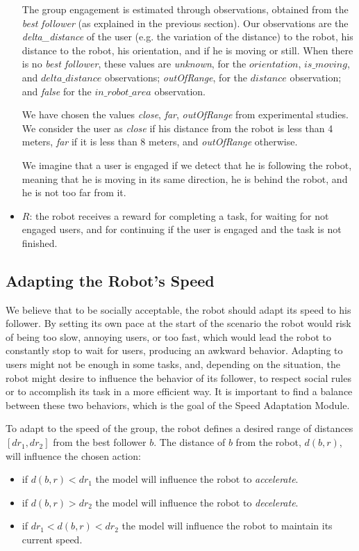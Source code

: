 \begin{itemize}
		The group engagement is estimated through observations, obtained from the \textit{best follower} (as explained in the previous section). Our observations are the \textit{delta\_distance} of the user (e.g. the variation of the distance) to the robot, his distance to the robot, his orientation, and if he is moving or still. When there is no \textit{best follower}, these values are \textit{unknown}, for the $orientation$, $is\_moving$, and $delta\_distance$ observations; \textit{outOfRange}, for the $distance$ observation; and \textit{false} for the $in\_robot\_area$ observation.

		We have chosen the values \textit{close}, \textit{far}, \textit{outOfRange} from experimental studies. We consider the user as \textit{close} if his distance from the robot is less than 4 meters, \textit{far} if it is less than 8 meters, and  \textit{outOfRange} otherwise.

		We imagine that a user is engaged if we detect that he is following the robot, meaning that he is moving in its same direction, he is behind the robot, and he is not too far from it.

	\item  $R$: the robot receives a reward for completing a task, for waiting for not engaged users, and for continuing if the user is engaged and the task is not finished.
\end{itemize}


\subsection{Adapting the Robot's Speed}
We believe that to be socially acceptable, the robot should adapt its speed to his follower. By setting its own pace at the start of the scenario the robot  would risk of being too slow, annoying users, or too fast, which would lead the robot to constantly stop to wait for users, producing an awkward behavior. Adapting to users might not be enough in some tasks, and, depending on the situation, the robot might desire to influence the behavior of its follower, to respect social rules or to accomplish its task in a more efficient way. It is important to find a balance between these two behaviors, which is the goal of the Speed Adaptation Module. 

To adapt to the speed of the group, the robot defines a desired range of distances $[dr_1,dr_2]$ from the best follower $b$. The distance of $b$ from the robot, $d(b,r)$, will influence the chosen action:
\begin{itemize}
\item if $d(b,r)<dr_1$ the model will influence the robot to \textit{accelerate}.
\item if $d(b,r)>dr_2$  the model will influence the robot to \textit{decelerate}.
\item if $dr_1<d(b,r)<dr_2$ the model will influence the robot to maintain its current speed.
\end{itemize} 

